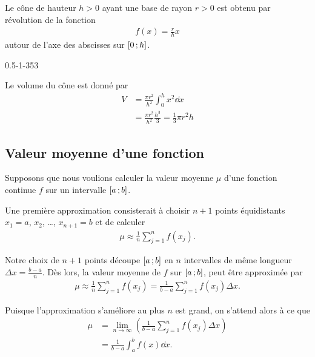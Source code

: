 \documentclass[main.tex]{subfiles}
\begin{document}
\begin{example}

    Le cône de hauteur $h > 0$ ayant une base de rayon $r > 0$ est obtenu par révolution de la fonction
    \begin{align}
        f(x) = \frac r h x
    \end{align}
    autour de l'axe des abscisses sur $\mathopen{[}0\,;h\mathclose{]}$.
    \begin{plot}
        {0.5}{-1}{-3}{5}{3}
    \end{plot}

    Le volume du cône est donné par
    \begin{align}
        V
        &= \frac {\pi r^2} {h^2} \int_0^h x^2 \dd x\\
        &= \frac {\pi r^2} {h^2} \frac {h^3} 3
        = \frac 1 3 \pi r^2 h
    \end{align}
\end{example}

\subsection{Valeur moyenne d'une fonction}

Supposons que nous voulions calculer la valeur moyenne $\mu$ d'une fonction continue $f$ sur un intervalle $\mathopen{[}a\,;b\mathclose{]}$.

Une première approximation consisterait à choisir $n + 1$ points équidistants $x_1 = a$, $x_2$, \dots, $x_{n + 1} = b$
et de calculer
\begin{align}
    \mu \approx \frac 1 n \sum_{j = 1}^n f(x_j).
\end{align}

Notre choix de $n + 1$ points découpe $\mathopen{[}a\,;b\mathclose{]}$ en $n$ intervalles de même longueur $\Delta x = \frac {b - a} n$.
Dès lors,
la valeur moyenne de $f$ sur $\mathopen{[}a\,;b\mathclose{]}$,
peut être approximée par
\begin{align}
    \mu \approx \frac 1 n \sum_{j = 1}^n f(x_j)
    = \frac 1 {b - a} \sum_{j = 1}^n f(x_j) \Delta x.
\end{align}

Puisque l'approximation s'améliore au plus $n$ est grand,
on s'attend alors à ce que
\begin{align}
    \mu &= \lim_{n \to \infty} \left(\frac 1 {b - a} \sum_{j = 1}^n f(x_j) \Delta x\right)\\
        &= \frac 1 {b - a} \int_a^b f(x) \dd x.
\end{align}
\end{document}
